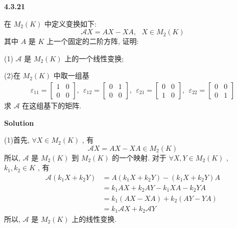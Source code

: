 \documentclass[11pt,a4paper,openany,oneside]{book}
\newcommand\Solution{\noindent\textbf{\textsf{Solution}}\par\medskip}
\begin{document}
\begin{myexample}
	\textbf{4.3.21}

在 $ M_2(K) $ 中定义变换如下:
 $$  \mathcal{A}X = AX -XA, \ \ \ X \in M_2(K)  $$ 
其中 $ A $ 是 $ K $ 上一个固定的二阶方阵, 证明:

(1) $ \mathcal{A} $ 是 $ M_2(K) $ 上的一个线性变换;

(2)在 $ M_2(K) $ 中取一组基
\begin{gather*}
\varepsilon_{11} = 
\begin{bmatrix}
1 & 0 \\
0 & 0
\end{bmatrix}, \ \ 
\varepsilon_{12}=
\begin{bmatrix}
0 & 1 \\
0 & 0
\end{bmatrix}, \ \ 
\varepsilon_{21}=
\begin{bmatrix}
0 & 0 \\
1 & 0
\end{bmatrix}, \ \ 
\varepsilon_{22}=
\begin{bmatrix}
0 & 0 \\
0 & 1
\end{bmatrix}
\end{gather*}
求 $ \mathcal{A} $ 在这组基下的矩阵. \\  

\end{myexample}
\Solution

(1)首先,  $ \forall X \in M_2(K) $ , 有
 $$  \mathcal{A}X = AX - XA \in M_2(K)  $$ 
所以,  $ \mathcal{A} $ 是 $ M_2(K) $ 到 $ M_2(K) $ 的一个映射. 对于 $ \forall X, Y \in M_2(K) $ ,  $ k_1, k_2 \in K $ , 有
\begin{align*}
\mathcal{A}(k_1X + k_2Y) &= A(k_1X+k_2Y) - (k_1X+k_2Y)A  \\
&= k_1AX+k_2AY - k_1XA-k_2YA  \\
&=k_1(AX-XA) + k_2(AY-YA)  \\ 
&=k_1\mathcal{A}X + k_2\mathcal{A}Y 
\end{align*}
所以,  $ \mathcal{A} $ 是 $ M_2(K) $ 上的线性变换. \\
\end{document}
